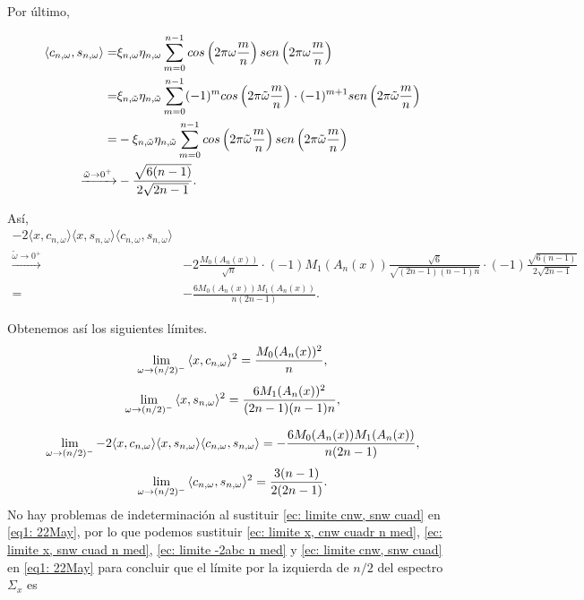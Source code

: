 Por último, 

\begin{align*}
\langle
c_{n, \omega}, s_{n, \omega}
\rangle = &
\xi_{n, \omega} \eta_{n, \omega}
\suma{m=0}{n-1}{
cos\left(
2 \pi \omega\frac{m}{n}
\right)
sen\left(
2 \pi \omega\frac{m}{n}
\right)
} \\
= &
\xi_{n, \tilde{\omega}} \eta_{n, \tilde{\omega}}
\suma{m=0}{n-1}{
(-1)^{m}cos\left(
2 \pi \tilde{\omega} \frac{m}{n}
\right) \cdot (-1)^{m+1}
sen\left(
2 \pi \tilde{\omega} \frac{m}{n}
\right)
}
\\
= &
-\xi_{n, \tilde{\omega}} \eta_{n, \tilde{\omega}}
\suma{m=0}{n-1}{
cos\left(
2 \pi \tilde{\omega}\frac{m}{n}
\right) 
sen\left(
2 \pi \tilde{\omega}\frac{m}{n}
\right)
}
\\
\xrightarrow{\tilde{\omega} \rightarrow 0^{+}}&
- \frac{\sqrt{6(n-1)}}{2 \sqrt{2n-1}}.
\end{align*}

Así,
\begin{align*}
-2 \langle x, c_{n, \omega} \rangle
\langle x, s_{n, \omega} \rangle
\langle c_{n, \omega}, s_{n, \omega} \rangle & \\
\xrightarrow{\tilde{\omega} \rightarrow 0^{+}} & 
-2 \frac{M_{0}(A_{n}(x))}{\sqrt{n}}
\cdot 
(-1) M_{1}(A_{n}(x)) \frac{\sqrt{6}}{
\sqrt{(2n-1)(n-1)n}}
\cdot (-1)
\frac{\sqrt{6(n-1)}}{2 \sqrt{2n-1}}
\\
= & - \frac{6 M_{0}(A_{n}(x)) M_{1}(A_{n}(x)) }{n(2n-1)}.
\end{align*}


Obtenemos así los siguientes límites.
\begin{equation}
\label{ec: limite x, cnw cuadr n med}
\lim\limits_{\omega \rightarrow (n/2)^{-}}{\langle
x, c_{n, \omega}
\rangle^{2} }
= \frac{M_{0}(A_{n}(x))^{2}}{n},
\end{equation}
\begin{equation}
\label{ec: limite x, snw cuad n med}
\lim\limits_{\omega \rightarrow (n/2)^{-}}{\langle
x, s_{n, \omega}
\rangle^{2} }
= \frac{6M_{1}(A_{n}(x))^{2}}{(2n-1)(n-1)n},
\end{equation}

\begin{equation}
\label{ec: limite -2abc n med}
\lim\limits_{\omega \rightarrow (n/2)^{-}}{
-2 \langle x, c_{n, \omega} \rangle
\langle x, s_{n, \omega} \rangle
\langle c_{n, \omega}, s_{n, \omega} \rangle
= 
- \frac{6M_{0}(A_{n}(x))M_{1}(A_{n}(x))}{n(2n-1)},
}
\end{equation}
\begin{equation}
\label{ec: limite cnw, snw cuad}
\lim\limits_{\omega \rightarrow (n/2)^{-}}{\langle
c_{n, \omega}, s_{n, \omega}
\rangle^{2} }
= \frac{3(n-1)}{2(2n-1)}.
\end{equation}
No hay problemas de indeterminación al 
sustituir \eqref{ec: limite cnw, snw cuad} en 
\eqref{eq1: 22May}, por lo que podemos 
sustituir 
\eqref{ec: limite x, cnw cuadr n med}, 
\eqref{ec: limite x, snw cuad n med}, 
\eqref{ec: limite -2abc n med} y 
\eqref{ec: limite cnw, snw cuad} en 
\eqref{eq1: 22May} para concluir que el límite por la izquierda
de $n/2$ del espectro $\Sigma_{x}$ es

